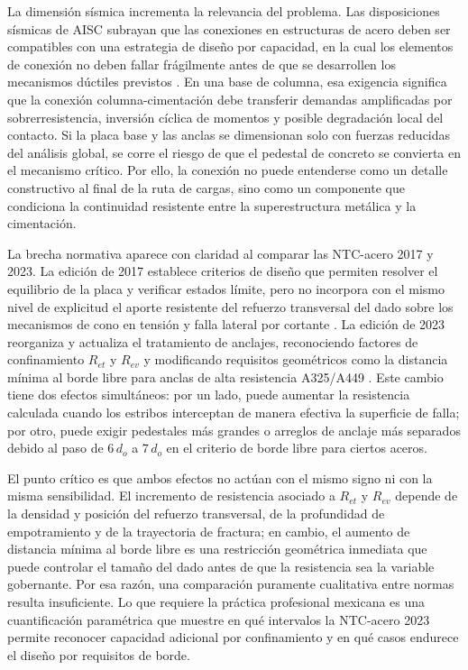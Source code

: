 La dimensión sísmica incrementa la relevancia del problema. Las disposiciones sísmicas de AISC
subrayan que las conexiones en estructuras de acero deben ser compatibles con una estrategia de
diseño por capacidad, en la cual los elementos de conexión no deben fallar frágilmente antes de que
se desarrollen los mecanismos dúctiles previstos \cite{AISC_341_2022}. En una base de columna, esa
exigencia significa que la conexión columna-cimentación debe transferir demandas amplificadas por
sobrerresistencia, inversión cíclica de momentos y posible degradación local del contacto. Si la
placa base y las anclas se dimensionan solo con fuerzas reducidas del análisis global, se corre el
riesgo de que el pedestal de concreto se convierta en el mecanismo crítico. Por ello, la conexión
no puede entenderse como un detalle constructivo al final de la ruta de cargas, sino como un
componente que condiciona la continuidad resistente entre la superestructura metálica y la
cimentación.

La brecha normativa aparece con claridad al comparar las NTC-acero 2017 y 2023. La edición de 2017
establece criterios de diseño que permiten resolver el equilibrio de la placa y verificar estados
límite, pero no incorpora con el mismo nivel de explicitud el aporte resistente del refuerzo
transversal del dado sobre los mecanismos de cono en tensión y falla lateral por cortante
\cite{GCDMX_NTC_DCEA_2017}. La edición de 2023 reorganiza y actualiza el tratamiento de anclajes,
reconociendo factores de confinamiento $R_{et}$ y $R_{ev}$ y modificando requisitos geométricos
como la distancia mínima al borde libre para anclas de alta resistencia A325/A449
\cite{GCDMX_NTC_DCEA_2023}. Este cambio tiene dos efectos simultáneos: por un lado, puede aumentar
la resistencia calculada cuando los estribos interceptan de manera efectiva la superficie de
falla; por otro, puede exigir pedestales más grandes o arreglos de anclaje más separados debido al
paso de $6\,d_o$ a $7\,d_o$ en el criterio de borde libre para ciertos aceros.

El punto crítico es que ambos efectos no actúan con el mismo signo ni con la misma sensibilidad.
El incremento de resistencia asociado a $R_{et}$ y $R_{ev}$ depende de la densidad y posición del
refuerzo transversal, de la profundidad de empotramiento y de la trayectoria de fractura; en
cambio, el aumento de distancia mínima al borde libre es una restricción geométrica inmediata que
puede controlar el tamaño del dado antes de que la resistencia sea la variable gobernante. Por esa
razón, una comparación puramente cualitativa entre normas resulta insuficiente. Lo que requiere la
práctica profesional mexicana es una cuantificación paramétrica que muestre en qué intervalos la
NTC-acero 2023 permite reconocer capacidad adicional por confinamiento y en qué casos endurece el
diseño por requisitos de borde.

